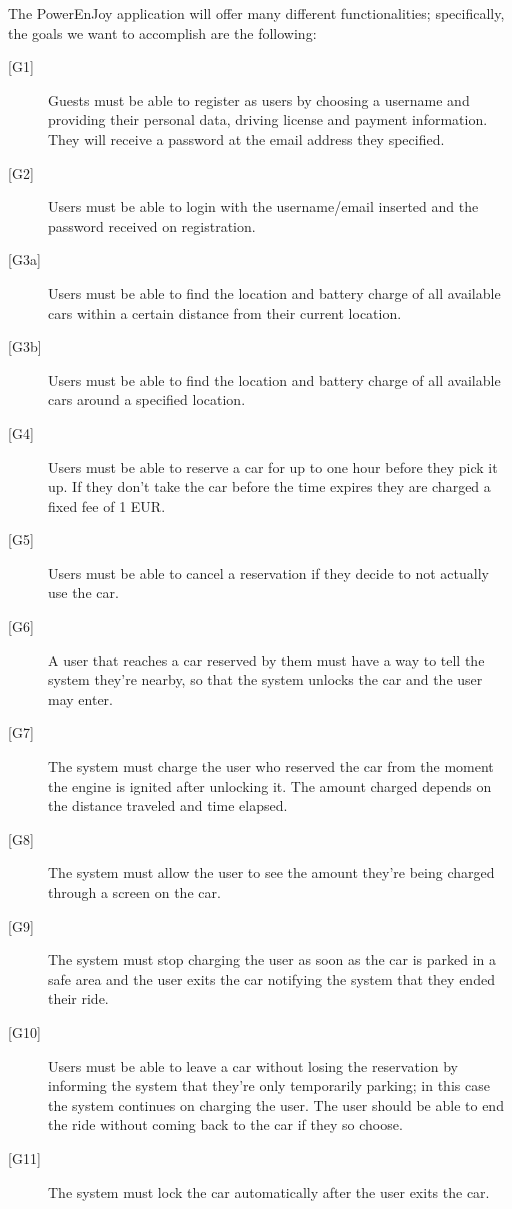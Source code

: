 \documentclass[english]{article}
\begin{document}
The PowerEnJoy application will offer many different functionalities; specifically, the goals we want to accomplish are the following:
\begin{description}
	\item[{[G1]}]{Guests must be able to register as users by choosing a username and providing their personal data, driving license and payment information. They will receive a password at the email address they specified.}
	\item[{[G2]}]{Users must be able to login with the username/email inserted and the password received on registration.}
	\item[{[G3a]}]{Users must be able to find the location and battery charge of all available cars within a certain distance from their current location.}
	\item[{[G3b]}]{Users must be able to find the location and battery charge of all available cars around a specified location.}
	\item[{[G4]}]{Users must be able to reserve a car for up to one hour before they pick it up. If they don't take the car before the time expires they are charged a fixed fee of 1 EUR.}
	\item[{[G5]}]{Users must be able to cancel a reservation if they decide to not actually use the car.}
	\item[{[G6]}]{A user that reaches a car reserved by them must have a way to tell the system they’re nearby, so that the system unlocks the car and the user may enter.}
	\item[{[G7]}]{The system must charge the user who reserved the car from the moment the engine is ignited after unlocking it. The amount charged depends on the distance traveled and time elapsed.}
	\item[{[G8]}]{The system must allow the user to see the amount they’re being charged through a screen on the car.}
	\item[{[G9]}]{The system must stop charging the user as soon as the car is parked in a safe area and the user exits the car notifying the system that they ended their ride.}
	\item[{[G10]}]{Users must be able to leave a car without losing the reservation by informing the system that they’re only temporarily parking; in this case the system continues on charging the user. The user should be able to end the ride without coming back to the car if they so choose.}
	\item[{[G11]}]{The system must lock the car automatically after the user exits the car.}

\end{description}
\end{document}

